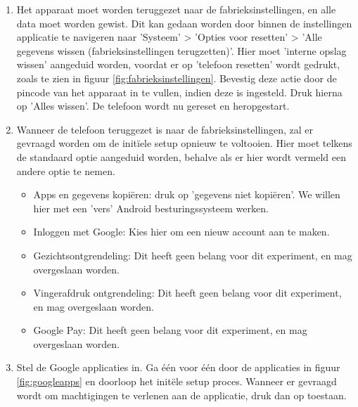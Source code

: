 \begin{enumerate}
    \item 
    \label{factoryreset}
    Het apparaat moet worden teruggezet naar de fabrieksinstellingen, en alle data moet worden gewist. Dit kan gedaan worden door binnen de instellingen applicatie te navigeren naar 'Systeem' > 'Opties voor resetten' > 'Alle gegevens wissen (fabrieksinstellingen terugzetten)'. Hier moet 'interne opslag wissen' aangeduid worden, voordat er op 'telefoon resetten' wordt gedrukt, zoals te zien in figuur \ref{fig:fabrieksinstellingen}. Bevestig deze actie door de pincode van het apparaat in te vullen, indien deze is ingesteld. Druk hierna op 'Alles wissen'. De telefoon wordt nu gereset en heropgestart.
    \item 
    \label{initialsetup}
    Wanneer de telefoon teruggezet is naar de fabrieksinstellingen, zal er gevraagd worden om de initïele setup opnieuw te voltooien. Hier moet telkens de standaard optie aangeduid worden, behalve als er hier wordt vermeld een andere optie te nemen.
    \begin{itemize}
        \item Apps en gegevens kopiëren: druk op 'gegevens niet kopiëren'. We willen hier met een 'vers' Android besturingssysteem werken.
        \item Inloggen met Google: Kies hier om een nieuw account aan te maken.
        \item Gezichtsontgrendeling: Dit heeft geen belang voor dit experiment, en mag overgeslaan worden.
        \item Vingerafdruk ontgrendeling: Dit heeft geen belang voor dit experiment, en mag overgeslaan worden.
        \item Google Pay: Dit heeft geen belang voor dit experiment, en mag overgeslaan worden.
    \end{itemize}
    \item 
    \label{setupgoogleapps}
    Stel de Google applicaties in. Ga één voor één door de applicaties in figuur \ref{fig:googleapps} en doorloop  het initële setup proces. Wanneer er gevraagd wordt om machtigingen te verlenen aan de applicatie, druk dan op toestaan.
\end{enumerate}

